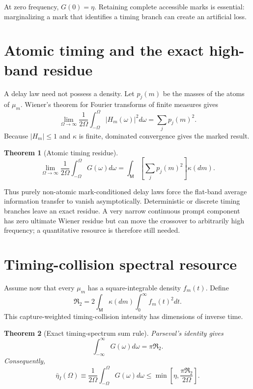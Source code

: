 \documentclass[aps,prapplied,preprint,nofootinbib]{revtex4-2}
\newtheorem{theorem}{Theorem}
\newcommand{\Rtwo}{\mathfrak R_2}
\newcommand{\M}{\mathsf M}
\begin{document}
At zero frequency, $G(0)=\eta$. Retaining complete accessible marks is essential: marginalizing a mark that identifies a timing branch can create an artificial loss.

\section{Atomic timing and the exact high-band residue}

A delay law need not possess a density. Let $p_j(m)$ be the masses of the atoms of $\mu_m$. Wiener's theorem for Fourier transforms of finite measures \cite{Katznelson2004} gives
\begin{equation}
\lim_{\Omega\to\infty}\frac{1}{2\Omega}
\int_{-\Omega}^{\Omega}|H_m(\omega)|^2d\omega
=\sum_jp_j(m)^2.
\end{equation}
Because $|H_m|\le1$ and $\kappa$ is finite, dominated convergence gives the marked result.

\begin{theorem}[Atomic timing residue]
\begin{equation}
\boxed{
\lim_{\Omega\to\infty}\frac{1}{2\Omega}
\int_{-\Omega}^{\Omega}G(\omega)d\omega
=\int_{\M}\left[\sum_jp_j(m)^2\right]\kappa(dm).}
\label{eq:atomic}
\end{equation}
\end{theorem}

Thus purely non-atomic mark-conditioned delay laws force the flat-band average information transfer to vanish asymptotically. Deterministic or discrete timing branches leave an exact residue. A very narrow continuous prompt component has zero ultimate Wiener residue but can move the crossover to arbitrarily high frequency; a quantitative resource is therefore still needed.

\section{Timing-collision spectral resource}

Assume now that every $\mu_m$ has a square-integrable density $f_m(t)$. Define
\begin{equation}
\boxed{
\Rtwo=2\int_{\M}\kappa(dm)\int_0^\infty f_m(t)^2dt.}
\label{eq:R2}
\end{equation}
This capture-weighted timing-collision intensity has dimensions of inverse time.

\begin{theorem}[Exact timing-spectrum sum rule]
Parseval's identity gives
\begin{equation}
\boxed{
\int_{-\infty}^{\infty}G(\omega)d\omega=\pi\Rtwo.}
\label{eq:parseval}
\end{equation}
Consequently,
\begin{equation}
\boxed{
\bar\eta_I(\Omega)
\equiv\frac{1}{2\Omega}\int_{-\Omega}^{\Omega}G(\omega)d\omega
\le\min\left[\eta,\frac{\pi\Rtwo}{2\Omega}\right].}
\label{eq:flat}
\end{equation}
\end{theorem}
\end{document}
